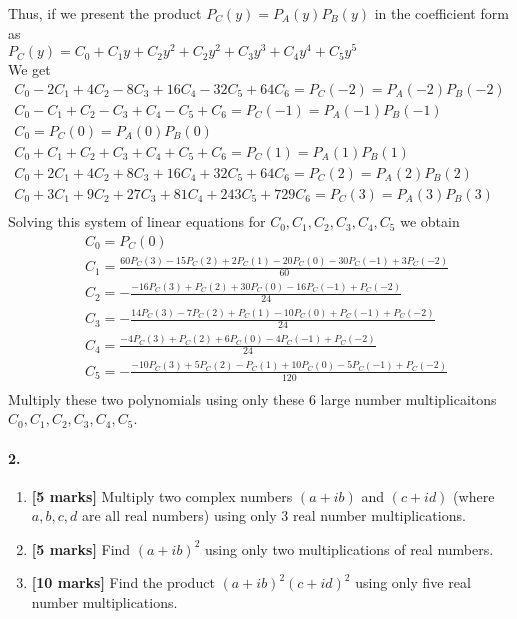 \documentclass[a4paper]{scrartcl}
\begin{document}
Thus, if we present the product $P_C(y)=P_A(y)P_B(y)$ in the coefficient form as\\
$P_C(y) = C_0 +C_1 y +C_2 y^2 +C_2 y^2 +C_3 y^3 +C_4 y^4 +C_5 y^5
$\\
We get
\begin{align*}
C_0 - 2C_1 + 4 C_2 - 8  C_3 + 16 C_4 - 32  C_5 + 64  C_6 = P_C(-2) = P_A(-2)P_B(-2)\\
C_0 -  C_1 +   C_2 -    C_3 +    C_4 -     C_5 +     C_6 = P_C(-1) = P_A(-1)P_B(-1)\\
C_0 =  P_C(0)  = P_A(0)P_B(0)\\
C_0 +  C_1 +   C_2 +    C_3 + C_4    +     C_5 +     C_6 =  P_C(1) = P_A(1)P_B(1) \\
C_0 + 2C_1 + 4 C_2 + 8  C_3 + 16C_4  + 32  C_5 + 64  C_6 =  P_C(2) = P_A(2)P_B(2) \\
C_0 + 3C_1 + 9 C_2 + 27 C_3 + 81 C_4 + 243 C_5 + 729 C_6 =  P_C(3) = P_A(3)P_B(3) \\
\end{align*}
Solving this system of linear equations for $C_0, C_1, C_2, C_3, C_4, C_5$ we obtain
\begin{align*}
&\
C_0 =  P_C(0) \\ &\
C_1 = \frac{60P_C(3)-15P_C(2)+2P_C(1)-20P_C(0)-30P_C(-1)+3P_C(-2)}{60}\\ &\
C_2 = -\frac{-16P_C(3)+P_C(2)+30P_C(0)-16P_C(-1)+P_C(-2)}{24}\\ &\
C_3 = -\frac{14P_C(3)-7P_C(2)+P_C(1)-10P_C(0)+P_C(-1)+P_C(-2)}{24}\\ &\
C_4 = \frac{-4P_C(3)+P_C(2)+6P_C(0)-4P_C(-1)+P_C(-2)}{24}\\ &\
C_5 = -\frac{-10P_C(3)+5P_C(2)-P_C(1)+10P_C(0)-5P_C(-1)+P_C(-2)}{120}\\ &\
\end{align*}
Multiply these two polynomials using only these 6 large number multiplicaitons $C_0, C_1, C_2, C_3, C_4, C_5$.
\paragraph{2.}
\label{sec:Question 2}
\begin{enumerate}[label=(\alph*)]
  \item {\bfseries[5 marks]} Multiply two complex numbers $(a + ib)$ and $(c + id)$ (where $a, b, c, d$ are all real numbers) using only 3 real number multiplications.
  \item {\bfseries[5 marks]} Find $(a + ib)^2$ using only two multiplications of real numbers.
  \item {\bfseries[10 marks]} Find the product $(a + ib)^2(c + id)^2$ using only five real number multiplications.
\end{enumerate}
\end{document}
